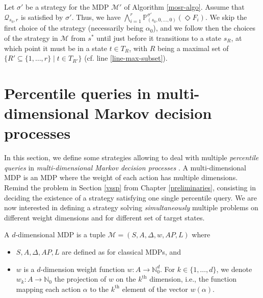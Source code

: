 \begin{proof2}
  Let $\sigma'$ be a strategy for the MDP $\mathcal{M}'$ of Algorithm \ref{mosr-algo}.
  Assume that $\mathcal{Q}_{s_0, r}$ is satisfied by $\sigma'$. Thus, we have $\bigwedge_{i=1}^r\mathbb{P}_{(s_0, 0, \dots, 0)}^{\sigma'}(\Diamond F_i)$.
  We skip the first choice of the strategy (necessarily being $\alpha_0$), and we follow then the choices of the strategy in $\mathcal{M}$ from $s^*$ until just before it transitions to a state $s_R$, at which point it must be in a state $t \in T_R$, with $R$ being a maximal set of $\{ R' \subseteq \{1, \dots, r\} \; | \; t \in T_{R'} \}$ (cf. line \ref{line-max-subset}).
  \flushright
\end{proof2}

\section{Percentile queries in multi-dimensional Markov decision processes}
In this section, we define some strategies allowing to deal with multiple \textit{percentile queries} in \textit{multi-dimensional Markov decision processes} \cite{DBLP:journals/fmsd/RandourRS17}.
A multi-dimensional MDP is an MDP where the weight of each action has multiple dimensions.
Remind the \SSPP{} problem in Section \ref{vssp} from Chapter \ref{preliminaries}, consisting in deciding the existence of a strategy satisfying one single percentile query.
We are now interested in defining a strategy solving \textit{simultaneously} multiple \SSPP{} problems on different weight dimensions and for different set of target states.

\begin{definition}
  A $d$-dimensional MDP is a tuple $\mathcal{M}=(S, A, \Delta, w, AP, L)$ where
  \begin{itemize}
    \item $S, A, \Delta, AP, L$ are defined as for classical MDPs, and
    \item $w$ is a $d$-dimension weight function $w: A \rightarrow \mathbb{N}_0^d$.
    For $k \in \{1, \dots, d\}$, we denote $w_k:A\rightarrow\mathbb{N}_0$ the projection of $w$ on the $k^\text{th}$ dimension, i.e., the function mapping each action $\alpha$ to the $k^\text{th}$ element of the vector $w(\alpha)$.
  \end{itemize}
\end{definition}

